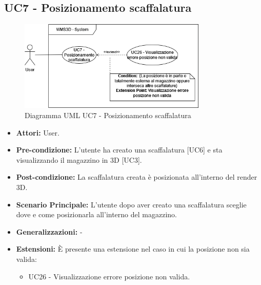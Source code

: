 \subsection{UC7 - Posizionamento scaffalatura}
\begin{figure}[H]
  \centering
  \includegraphics[width=0.8\textwidth]{UC_diagrams_1-10/UC7.drawio.png}
   \caption{Diagramma UML UC7 - Posizionamento scaffalatura}
\end{figure}
\begin{itemize}
    \item \textbf{Attori:} User.
    \item \textbf{Pre-condizione:}  L'utente ha creato una scaffalatura [UC6] e sta visualizzando il magazzino in 3D [UC3].
    \item \textbf{Post-condizione:} La scaffalatura creata è posizionata all'interno del render 3D.
    \item \textbf{Scenario Principale:} L'utente dopo aver creato una scaffalatura sceglie dove e come posizionarla all'interno del magazzino.
    \item \textbf{Generalizzazioni:} -
    \item \textbf{Estensioni:} È presente una estensione nel caso in cui la posizione non sia valida:
    \begin{itemize}
        \item UC26 - Visualizzazione errore posizione non valida.
    \end{itemize}
\end{itemize}